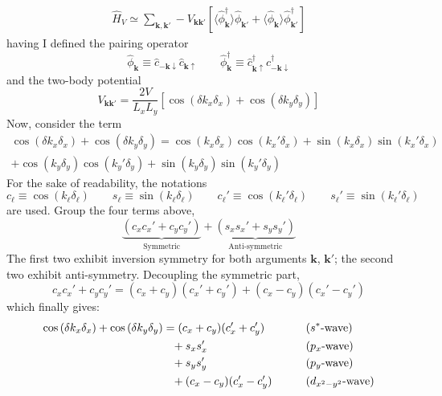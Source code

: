 \[
\begin{aligned}
	\hat H_V \simeq \sum_{\mathbf{k}, \mathbf{k}'}
	- V_{\mathbf{k}\mathbf{k}'} \left[
		\langle 
			\hat \phi_\mathbf{k}^\dagger
		\rangle \hat \phi_{\mathbf{k}'} + \langle 
			\hat \phi_\mathbf{k}
		\rangle \hat \phi_{\mathbf{k}'}^\dagger
	\right]	
\end{aligned}
\]
having I defined the pairing operator 
\[
	\hat \phi_\mathbf{k} \equiv \hat c_{-\mathbf{k}\downarrow} \hat c_{\mathbf{k} \uparrow}
	\qquad
	\hat \phi_\mathbf{k}^\dagger \equiv \hat c_{\mathbf{k} \uparrow}^\dagger \hat c_{-\mathbf{k}\downarrow}^\dagger
\]
and the two-body potential
\[
	V_{\mathbf{k}\mathbf{k}'} = \frac{2V}{L_x L_y} \left[
		\cos \left(
			\delta k_x \delta_x
			\right)	+ \cos \left(
			\delta k_y \delta_y
		\right)	
	\right]
\]
Now, consider the term
\begin{multline*}
	\cos \left( \delta k_x \delta_x \right)	+ \cos \left( \delta k_y \delta_y \right) = \cos \left( k_x \delta_x \right) \cos \left( k_x' \delta_x \right) + \sin \left( 
		k_x \delta_x \right) \sin \left( k_x' \delta_x
	\right) \\ 
	+ \cos \left(
		k_y \delta_y \right) \cos \left( k_y' \delta_y
	\right) + \sin \left( 
		k_y \delta_y 
	\right) \sin \left( 
		k_y' \delta_y
	\right)
\end{multline*}
For the sake of readability, the notations
\[
	c_\ell \equiv \cos\left(
		k_\ell \delta_\ell
	\right)
	\qquad
	s_\ell \equiv \sin \left(
		k_\ell \delta_\ell
	\right)
	\qquad
	c_\ell' \equiv \cos\left(
		k_\ell' \delta_\ell
	\right)
	\qquad
	s_\ell' \equiv \sin \left(
		k_\ell' \delta_\ell
	\right)
\]
are used. Group the four terms above,
\begin{equation}\label{eq:sym-asym-couplings-gap}
	\underbrace{
		\left(c_x c_x' + c_y c_y' \right) 
	}_\text{Symmetric}
	+ \underbrace{
		\left(s_x s_x' + s_y s_y' \right)
	}_\text{Anti-symmetric}
\end{equation}
The first two exhibit inversion symmetry for both arguments $\mathbf{k}$, $\mathbf{k}'$; the second two exhibit anti-symmetry. Decoupling the symmetric part,
\[
	c_x c_x' + c_y c_y' = (c_x + c_y)(c_x' + c_y') + (c_x - c_y)(c_x' - c_y')
\]
which finally gives:
\[
\begin{aligned}
	\cos \left( \delta k_x \delta_x \right)	+ \cos \left( \delta k_y \delta_y \right) &= (c_x + c_y)(c_x' + c_y') &&\qquad\text{($s^*$-wave)} \\
	&\hphantom{=}+ s_x s_x' &&\qquad\text{($p_x$-wave)} \\
	&\hphantom{=}+ s_y s_y' &&\qquad\text{($p_y$-wave)} \\
	&\hphantom{=}+ (c_x - c_y)(c_x' - c_y') &&\qquad\text{($d_{x^2-y^2}$-wave)}
\end{aligned}
\]
